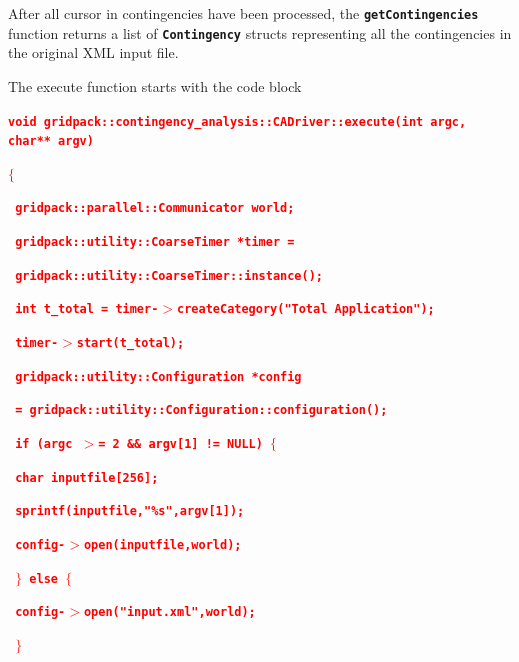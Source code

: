 \documentclass[12pt]{report} %
\begin{document}
After all cursor in contingencies have been processed, the \texttt{\textbf{getContingencies}} function returns a list of \texttt{\textbf{Contingency}} structs representing all the contingencies in the original XML input file.

The execute function starts with the code block

\textcolor{red}{\texttt{\textbf{void gridpack::contingency\_analysis::CADriver::execute(int argc, char** argv)}}}

\textcolor{red}{\texttt{\textbf{$\boldsymbol{\mathrm{\{}}$}}}

\textcolor{red}{\texttt{\textbf{  gridpack::parallel::Communicator world;}}}

\textcolor{red}{\texttt{\textbf{  gridpack::utility::CoarseTimer *timer =}}}

\textcolor{red}{\texttt{\textbf{    gridpack::utility::CoarseTimer::instance();}}}

\textcolor{red}{\texttt{\textbf{  int t\_total = timer-$\boldsymbol{\mathrm{>}}$createCategory("Total Application");}}}

\textcolor{red}{\texttt{\textbf{  timer-$\boldsymbol{\mathrm{>}}$start(t\_total);}}}

\textcolor{red}{\texttt{\textbf{}}}

\textcolor{red}{\texttt{\textbf{  gridpack::utility::Configuration *config}}}

\textcolor{red}{\texttt{\textbf{    = gridpack::utility::Configuration::configuration();}}}

\textcolor{red}{\texttt{\textbf{  if (argc $\boldsymbol{\mathrm{>}}$= 2 \&\& argv[1] != NULL) $\boldsymbol{\mathrm{\{}}$}}}

\textcolor{red}{\texttt{\textbf{    char inputfile[256];}}}

\textcolor{red}{\texttt{\textbf{    sprintf(inputfile,"\%s",argv[1]);}}}

\textcolor{red}{\texttt{\textbf{    config-$\boldsymbol{\mathrm{>}}$open(inputfile,world);}}}

\textcolor{red}{\texttt{\textbf{  $\boldsymbol{\mathrm{\}}}$ else $\boldsymbol{\mathrm{\{}}$}}}

\textcolor{red}{\texttt{\textbf{    config-$\boldsymbol{\mathrm{>}}$open("input.xml",world);}}}

\textcolor{red}{\texttt{\textbf{  $\boldsymbol{\mathrm{\}}}$}}}
\end{document}
